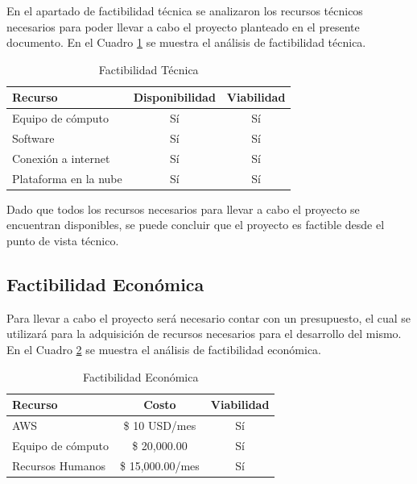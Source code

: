 En el apartado de factibilidad técnica se analizaron los recursos técnicos
necesarios para poder llevar a cabo el proyecto planteado en el presente
documento. En el Cuadro \ref{table:factibilidad_tecnica} se muestra el análisis
de factibilidad técnica.

\begin{table}[H]
\centering
\begin{tabular}{|p{5cm}|c|c|}
\hline
\rowcolor{azulclaro}
  \centering\textbf{Recurso} & \centering\textbf{Disponibilidad}\arraybackslash & \centering\textbf{Viabilidad}\arraybackslash \\
\hline
Equipo de cómputo & Sí & Sí \\
\hline
  Software & Sí & Sí \\
\hline
  Conexión a internet & Sí & Sí \\
\hline
  Plataforma en la nube & Sí & Sí \\
\hline
\end{tabular}
\caption{Factibilidad Técnica}
\label{table:factibilidad_tecnica}
\end{table}

Dado que todos los recursos necesarios para llevar a cabo el proyecto se
encuentran disponibles, se puede concluir que el proyecto es factible desde el
punto de vista técnico.

\subsection{Factibilidad Económica}

Para llevar a cabo el proyecto será necesario contar con un presupuesto, el cual
se utilizará para la adquisición de recursos necesarios para el desarrollo del
mismo. En el Cuadro \ref{table:factibilidad_economica} se muestra el análisis de
factibilidad económica.

\begin{table}[H]
\centering
\begin{tabular}{|p{5cm}|c|c|}
\hline
\rowcolor{azulclaro}
  \centering\textbf{Recurso} & \textbf{Costo} & \textbf{Viabilidad}\arraybackslash \\
\hline
AWS & \$ 10 USD/mes & Sí \\
\hline
Equipo de cómputo & \$ 20,000.00 & Sí \\
\hline
  Recursos Humanos & \$ 15,000.00/mes & Sí \\
\hline
\end{tabular}
\caption{Factibilidad Económica}
\label{table:factibilidad_economica}
\end{table}

